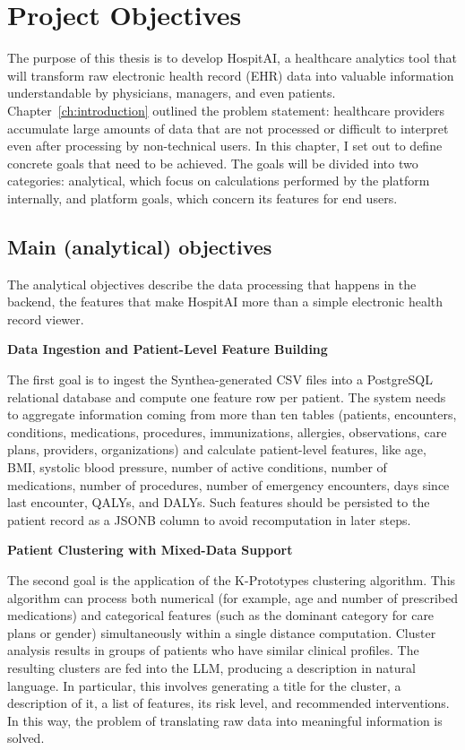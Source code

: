 \chapter{Project Objectives}\label{ch:objectives}

The purpose of this thesis is to develop HospitAI, a healthcare analytics tool that will transform raw electronic health record (EHR) data into valuable information understandable by physicians, managers, and even patients. Chapter~\ref{ch:introduction} outlined the problem statement: healthcare providers accumulate large amounts of data that are not processed or difficult to interpret even after processing by non-technical users. In this chapter, I set out to define concrete goals that need to be achieved. The goals will be divided into two categories: analytical, which focus on calculations performed by the platform internally, and platform goals, which concern its features for end users.

\section{Main (analytical) objectives}

The analytical objectives describe the data processing that happens in the backend, the features that make HospitAI more than a simple electronic health record viewer.

\vspace{0.5em}
\noindent\textbf{Data Ingestion and Patient-Level Feature Building}

The first goal is to ingest the Synthea-generated CSV files into a PostgreSQL relational database and compute one feature row per patient. The system needs to aggregate information coming from more than ten tables (patients, encounters, conditions, medications, procedures, immunizations, allergies, observations, care plans, providers, organizations) and calculate patient-level features, like age, BMI, systolic blood pressure, number of active conditions, number of medications, number of procedures, number of emergency encounters, days since last encounter, QALYs, and DALYs. Such features should be persisted to the patient record as a JSONB column to avoid recomputation in later steps.

\vspace{0.5em}
\noindent\textbf{Patient Clustering with Mixed-Data Support}

The second goal is the application of the K-Prototypes clustering algorithm. This algorithm can process both numerical (for example, age and number of prescribed medications) and categorical features (such as the dominant category for care plans or gender) simultaneously within a single distance computation. Cluster analysis results in groups of patients who have similar clinical profiles. The resulting clusters are fed into the LLM, producing a description in natural language. In particular, this involves generating a title for the cluster, a description of it, a list of features, its risk level, and recommended interventions. In this way, the problem of translating raw data into meaningful information is solved.

